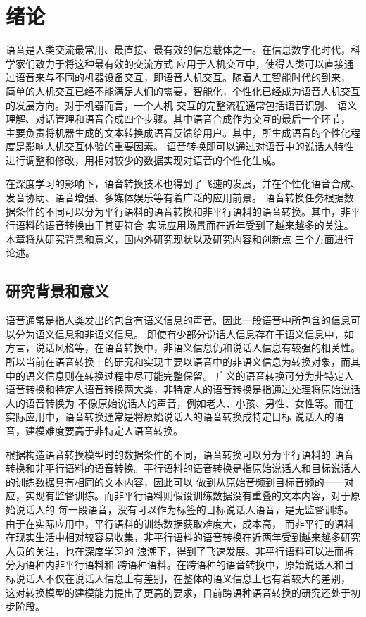 \chapter{绪论}
语音是人类交流最常用、最直接、最有效的信息载体之一。在信息数字化时代，科学家们致力于将这种最有效的交流方式
应用于人机交互中，使得人类可以直接通过语音来与不同的机器设备交互，即语音人机交互。随着人工智能时代的到来，
简单的人机交互已经不能满足人们的需要，智能化，个性化已经成为语音人机交互的发展方向。对于机器而言，一个人机
交互的完整流程通常包括语音识别、
语义理解、对话管理和语音合成四个步骤。其中语音合成作为交互的最后一个环节，
主要负责将机器生成的文本转换成语音反馈给用户。其中，所生成语音的个性化程度是影响人机交互体验的重要因素。
语音转换即可以通过对语音中的说话人特性进行调整和修改，用相对较少的数据实现对语音的个性化生成。

在深度学习的影响下，语音转换技术也得到了飞速的发展，并在个性化语音合成、发音协助、语音增强、多媒体娱乐等有着广泛的应用前景。
语音转换任务根据数据条件的不同可以分为平行语料的语音转换和非平行语料的语音转换。其中，非平行语料的语音转换由于其更符合
实际应用场景而在近年受到了越来越多的关注。本章将从研究背景和意义，国内外研究现状以及研究内容和创新点
三个方面进行论述。

\section{研究背景和意义}
语音通常是指人类发出的包含有语义信息的声音。因此一段语音中所包含的信息可以分为语义信息和非语义信息\cite{kinnunen2010overview, 刘蕊2009发声的生理结构和嗓音的保护}。
即使有少部分说话人信息存在于语义信息中，如方言，说话风格等，在语音转换中，非语义信息仍和说话人信息有较强的相关性\cite{Nurminen12}。
所以当前在语音转换上的研究和实现主要以语音中的非语义信息为转换对象，而其中的语义信息则在转换过程中尽可能完整保留。
广义的语音转换可分为非特定人语音转换和特定人语音转换两大类，非特定人的语音转换是指通过处理将原始说话人的语音转换为
不像原始说话人的声音，例如老人、小孩、男性、女性等。而在实际应用中，语音转换通常是将原始说话人的语音转换成特定目标
说话人的语音，建模难度要高于非特定人语音转换。

根据构造语音转换模型时的数据条件的不同，语音转换可以分为平行语料的
语音转换和非平行语料的语音转换。平行语料的语音转换是指原始说话人和目标说话人的训练数据具有相同的文本内容，因此可以
做到从原始音频到目标音频的一一对应，实现有监督训练。而非平行语料则假设训练数据没有重叠的文本内容，对于原始说话人的
每一段语音，没有可以作为标签的目标说话人语音，是无监督训练。由于在实际应用中，平行语料的训练数据获取难度大，成本高，
而非平行的语料在现实生活中相对较容易收集，非平行语料的语音转换在近两年受到越来越多研究人员的关注，也在深度学习的
浪潮下，得到了飞速发展。非平行语料可以进而拆分为语种内非平行语料和
跨语种语料。在跨语种的语音转换中，原始说话人和目标说话人不仅在说话人信息上有差别，在整体的语义信息上也有着较大的差别，
这对转换模型的建模能力提出了更高的要求，目前跨语种语音转换的研究还处于初步阶段。

